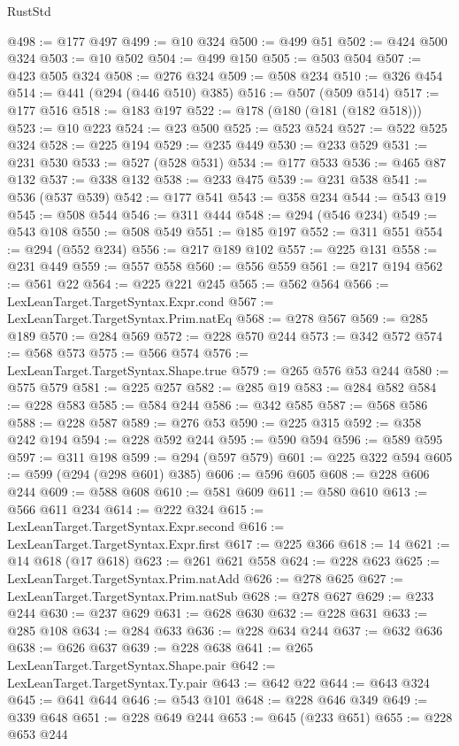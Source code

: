 \begin{lexlean}{RustStd}
\begin{coremodule}
@498 := @177 @497
@499 := @10 @324
@500 := @499 @51
@502 := @424 @500 @324
@503 := @10 @502
@504 := @499 @150
@505 := @503 @504
@507 := @423 @505 @324
@508 := @276 @324
@509 := @508 @234
@510 := @326 @454
@514 := @441 (@294 (@446 @510) @385)
@516 := @507 (@509 @514)
@517 := @177 @516
@518 := @183 @197
@522 := @178 (@180 (@181 (@182 @518)))
@523 := @10 @223
@524 := @23 @500
@525 := @523 @524
@527 := @522 @525 @324
@528 := @225 @194
@529 := @235 @449
@530 := @233 @529
@531 := @231 @530
@533 := @527 (@528 @531)
@534 := @177 @533
@536 := @465 @87 @132
@537 := @338 @132
@538 := @233 @475
@539 := @231 @538
@541 := @536 (@537 @539)
@542 := @177 @541
@543 := @358 @234
@544 := @543 @19
@545 := @508 @544
@546 := @311 @444
@548 := @294 (@546 @234)
@549 := @543 @108
@550 := @508 @549
@551 := @185 @197
@552 := @311 @551
@554 := @294 (@552 @234)
@556 := @217 @189 @102
@557 := @225 @131
@558 := @231 @449
@559 := @557 @558
@560 := @556 @559
@561 := @217 @194
@562 := @561 @22
@564 := @225 @221 @245
@565 := @562 @564
@566 := LexLeanTarget.TargetSyntax.Expr.cond
@567 := LexLeanTarget.TargetSyntax.Prim.natEq
@568 := @278 @567
@569 := @285 @189
@570 := @284 @569
@572 := @228 @570 @244
@573 := @342 @572
@574 := @568 @573
@575 := @566 @574
@576 := LexLeanTarget.TargetSyntax.Shape.true
@579 := @265 @576 @53 @244
@580 := @575 @579
@581 := @225 @257
@582 := @285 @19
@583 := @284 @582
@584 := @228 @583
@585 := @584 @244
@586 := @342 @585
@587 := @568 @586
@588 := @228 @587
@589 := @276 @53
@590 := @225 @315
@592 := @358 @242 @194
@594 := @228 @592 @244
@595 := @590 @594
@596 := @589 @595
@597 := @311 @198
@599 := @294 (@597 @579)
@601 := @225 @322 @594
@605 := @599 (@294 (@298 @601) @385)
@606 := @596 @605
@608 := @228 @606 @244
@609 := @588 @608
@610 := @581 @609
@611 := @580 @610
@613 := @566 @611 @234
@614 := @222 @324
@615 := LexLeanTarget.TargetSyntax.Expr.second
@616 := LexLeanTarget.TargetSyntax.Expr.first
@617 := @225 @366
@618 := 14
@621 := @14 @618 (@17 @618)
@623 := @261 @621 @558
@624 := @228 @623
@625 := LexLeanTarget.TargetSyntax.Prim.natAdd
@626 := @278 @625
@627 := LexLeanTarget.TargetSyntax.Prim.natSub
@628 := @278 @627
@629 := @233 @244
@630 := @237 @629
@631 := @628 @630
@632 := @228 @631
@633 := @285 @108
@634 := @284 @633
@636 := @228 @634 @244
@637 := @632 @636
@638 := @626 @637
@639 := @228 @638
@641 := @265 LexLeanTarget.TargetSyntax.Shape.pair
@642 := LexLeanTarget.TargetSyntax.Ty.pair
@643 := @642 @22
@644 := @643 @324
@645 := @641 @644
@646 := @543 @101
@648 := @228 @646 @349
@649 := @339 @648
@651 := @228 @649 @244
@653 := @645 (@233 @651)
@655 := @228 @653 @244

\end{coremodule}
\end{lexlean}
